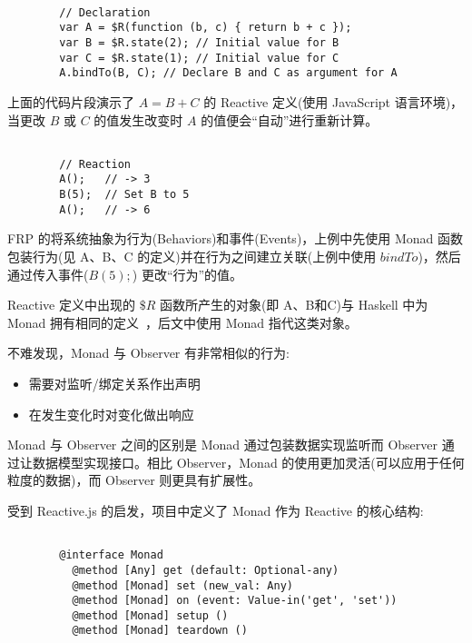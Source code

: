 \begin{verbatim}

        // Declaration
        var A = $R(function (b, c) { return b + c });
        var B = $R.state(2); // Initial value for B
        var C = $R.state(1); // Initial value for C
        A.bindTo(B, C); // Declare B and C as argument for A

\end{verbatim}

上面的代码片段演示了 $A = B + C$ 的 Reactive 定义(使用 JavaScript 语言环境)，当更改 $B$ 或 $C$ 的值发生改变时 $A$ 的值便会“自动”进行重新计算。

\begin{verbatim}

        // Reaction
        A();   // -> 3
        B(5);  // Set B to 5
        A();   // -> 6

\end{verbatim}

FRP 的将系统抽象为行为(Behaviors)和事件(Events)，上例中先使用 Monad 函数包装行为(见 A、B、C 的定义)并在行为之间建立关联(上例中使用 $bindTo$)，然后通过传入事件($B(5);$) 更改“行为”的值。

Reactive 定义中出现的 $\$R$ 函数所产生的对象(即 A、B和C)与 Haskell 中为 Monad 拥有相同的定义~\cite{raey}，后文中使用 Monad 指代这类对象。

不难发现，Monad 与 Observer 有非常相似的行为:

\begin{itemize}
  \item 需要对监听/绑定关系作出声明
  \item 在发生变化时对变化做出响应
\end{itemize}

Monad 与 Observer 之间的区别是 Monad 通过包装数据实现监听而 Observer 通过让数据模型实现接口。相比 Observer，Monad 的使用更加灵活(可以应用于任何粒度的数据)，而 Observer 则更具有扩展性。

受到 Reactive.js 的启发，项目中定义了 Monad 作为 Reactive 的核心结构:

\begin{verbatim}

        @interface Monad
          @method [Any] get (default: Optional-any)
          @method [Monad] set (new_val: Any)
          @method [Monad] on (event: Value-in('get', 'set'))
          @method [Monad] setup ()
          @method [Monad] teardown ()

\end{verbatim}

